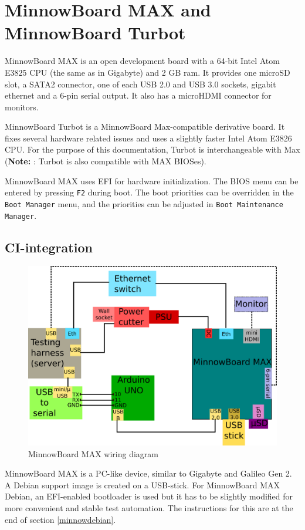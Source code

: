 \documentclass[a4paper,11pt]{article}
\newcommand{\note}{\textbf{Note: }}
\newcommand{\cmd}[1]{\texttt{#1}}
\begin{document}
\pagebreak

\section{MinnowBoard MAX and MinnowBoard Turbot}
\label{minnowboard}

MinnowBoard MAX is an open development board with a 64-bit Intel Atom E3825 CPU (the same as in Gigabyte) and 2 GB ram. It provides one microSD slot, a SATA2 connector, one of each USB 2.0 and USB 3.0 sockets, gigabit ethernet and a 6-pin serial output. It also has a microHDMI connector for monitors.

MinnowBoard Turbot is a MinnowBoard Max-compatible derivative board. It fixes several hardware related issues and uses a slightly faster Intel Atom E3826 CPU. For the purpose of this documentation, Turbot is interchangeable with Max (\note: Turbot is also compatible with MAX BIOSes).

MinnowBoard MAX uses EFI for hardware initialization. The BIOS menu can be entered by pressing \cmd{F2} during boot. The boot priorities can be overridden in the \cmd{Boot Manager} menu, and the priorities can be adjusted in \cmd{Boot Maintenance Manager}.

\subsection{CI-integration}

\begin{figure}[h]
	\centering
	\includegraphics[width=0.7\linewidth]{minnowwiring.png}
	\caption{MinnowBoard MAX wiring diagram}
	\label{fig:minnowwiring}
\end{figure}

MinnowBoard MAX is a PC-like device, similar to Gigabyte and Galileo Gen 2. A Debian support image is created on a USB-stick. For MinnowBoard MAX Debian, an EFI-enabled bootloader is used but it has to be slightly modified for more convenient and stable test automation. The instructions for this are at the end of section \ref{minnowdebian}.
\end{document}
